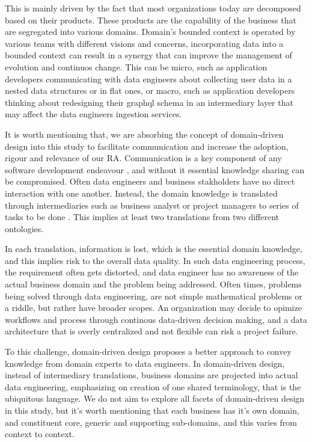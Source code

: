 \documentclass[review]{elsarticle}
\begin{document}
This is mainly driven by the fact that most organizations today are decomposed based on their products. These products are the capability of the business that are segregated into various domains. Domain's bounded context is operated by various teams with different visions and concerns, incorporating data into a bounded context can result in a synergy that can improve the management of evolution and continuos change. This can be micro, such as application developers communicating with data engineers about collecting user data in a nested data structures or in flat ones, or macro, such as application developers thinking about redesigning their graphql schema in an intermediary layer that may affect the data engineers ingestion services.

It is worth mentioning that, we are absorbing the concept of domain-driven design into this study to facilitate communication and increase the adoption, rigour and relevance of our RA. Communication is a key component of any software development endeavour \cite{sudhakar2012model}, and without it essential knowledge sharing can be compromised. Often data engineers and business stakholders have no direct interaction with one another. Instead, the domain knowledge is translated through intermediaries such as business analyst or project managers to series of tasks to be done \cite{khononov2021learning}. This implies at least two translations from two different ontologies. 

In each translation, information is lost, which is the essential domain knowledge, and this implies risk to the overall data quality. In such data engineering process, the requirement often gets distorted, and data engineer has no awareness of the actual business domain and the problem being addressed. Often times, problems being solved through data engineering, are not simple mathematical problems or a riddle, but rather have broader scopes. An organization may decide to opimize workflows and process through continous data-driven decision making, and a data architecture that is overly centralized and not flexible can risk a project failure. 

To this challenge, domain-driven design proposes a better approach to convey knowledge from domain experts to data engineers. In domain-driven design, instead of intermediary translations, business domains are projected into actual data engineering, emphasizing on creation of one shared terminology, that is the ubiquitous language. We do not aim to explore all facets of domain-driven design in this study, but it's worth mentioning that each business has it's own domain, and constituent core, generic and supporting sub-domains, and this varies from context to context.
\end{document}

